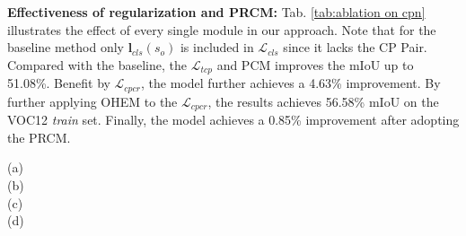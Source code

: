 \documentclass[10pt,twocolumn,letterpaper]{article}
\begin{document}
\noindent\textbf{Effectiveness of regularization and PRCM:}\; Tab. \ref{tab:ablation on cpn} illustrates the effect of every single module in our approach. Note that for the baseline method only $\boldsymbol{l}_{cls}(s_o)$ is included in $\mathcal {L}_{cls}$ since it lacks the CP Pair. Compared with the baseline, the $\mathcal {L}_{tcp}$ and PCM improves the mIoU up to 51.08\%. Benefit by $\mathcal {L}_{cpcr}$, the model further achieves a 4.63\% improvement. By further applying OHEM to the $\mathcal {L}_{cpcr}$, the results achieves 56.58\% mIoU on the VOC12 \textit{train} set. Finally, the model achieves a 0.85\% improvement after adopting the PRCM.
\begin{figure*}[htbp]
\centering
\begin{minipage}[t]{0.02\linewidth}
        \centering
        {}
        \vspace{-0.8cm}
        {(a)}
        \\
        \vspace{1.1cm}
        {(b)}
        \\
        \vspace{1.1cm}
        {(c)}
        \\
        \vspace{1.0cm}  {(d)}
        \end{minipage}
\hspace{-3mm}
\end{figure*}
\end{document}

